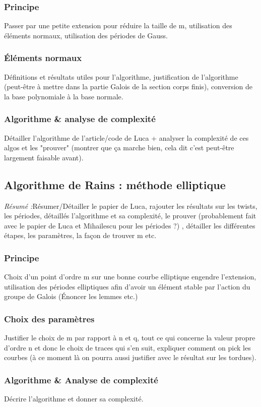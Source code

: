 \documentclass[a4paper]{article} %
\numberwithin{equation}{section}
\begin{document}
\subsubsection{Principe}
Passer par une petite extension pour réduire la taille de m, utilisation des
éléments normaux, utilisation des périodes de Gauss.
\subsubsection{Éléments normaux}
Définitions et résultats utiles pour l'algorithme, justification de
l'algorithme (peut-être à mettre dans la partie Galois de la section corps
finis), conversion de la base polynomiale à la base normale.
\subsubsection{Algorithme \& analyse de complexité}
Détailler l'algorithme de l'article/code de Luca + analyser la complexité de ces
algos et les "prouver" (montrer que ça marche bien, cela dit c'est peut-être
largement faisable avant).

\subsection{Algorithme de Rains : méthode elliptique}
\textit{Résumé :}Résumer/Détailler le papier de Luca, rajouter les résultats sur
les twists, les périodes, détaillés l'algorithme et sa complexité, le prouver 
(probablement fait avec le papier de Luca et Mihailescu pour les périodes ?)
, détailler les différentes étapes, les paramètres, la façon de trouver m 
etc.
\subsubsection{Principe}
Choix d'un point d'ordre m sur une bonne courbe elliptique engendre 
l'extension, utilisation des périodes elliptiques afin d'avoir un élément 
stable par l'action du groupe de Galois (Énoncer les lemmes etc.)
\subsubsection{Choix des paramètres}
Justifier le choix de m par rapport à n et q, tout ce qui concerne la valeur 
propre d'ordre n et donc le choix de traces qui s'en suit, expliquer comment on
pick les courbes (à ce moment là on pourra aussi justifier avec le résultat 
sur les tordues).
\subsubsection{Algorithme \& Analyse de complexité}
Décrire l'algorithme et donner sa complexité.
\end{document}
